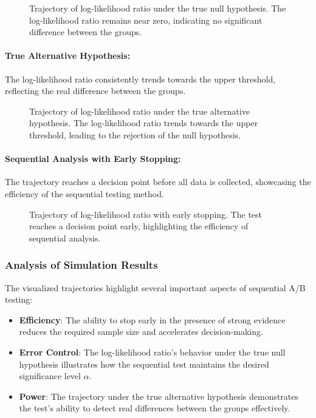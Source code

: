 \documentclass[magisterska, english]{pwr_wmat_praca_dyplomowa}
\theoremstyle{plain}
\numberwithin{theorem}{chapter}
\theoremstyle{definition}
\numberwithin{theorem}{chapter}
\begin{document}
\begin{figure}[H]
	\centering
	\caption{Trajectory of log-likelihood ratio under the true null hypothesis. The log-likelihood ratio remains near zero, indicating no significant difference between the groups.}
	\label{fig:null_hypothesis_trajectory}
\end{figure}

\paragraph{True Alternative Hypothesis:}
The log-likelihood ratio consistently trends towards the upper threshold, reflecting the real difference between the groups.

\begin{figure}[H]
	\centering
	\caption{Trajectory of log-likelihood ratio under the true alternative hypothesis. The log-likelihood ratio trends towards the upper threshold, leading to the rejection of the null hypothesis.}
	\label{fig:alternative_hypothesis_trajectory}
\end{figure}

\paragraph{Sequential Analysis with Early Stopping:}
The trajectory reaches a decision point before all data is collected, showcasing the efficiency of the sequential testing method.

\begin{figure}[H]
	\centering
	\caption{Trajectory of log-likelihood ratio with early stopping. The test reaches a decision point early, highlighting the efficiency of sequential analysis.}
	\label{fig:early_stopping_trajectory}
\end{figure}

\subsubsection{Analysis of Simulation Results}

The visualized trajectories highlight several important aspects of sequential A/B testing:
\begin{itemize}
	\item \textbf{Efficiency}: The ability to stop early in the presence of strong evidence reduces the required sample size and accelerates decision-making.
	\item \textbf{Error Control}: The log-likelihood ratio's behavior under the true null hypothesis illustrates how the sequential test maintains the desired significance level \(\alpha\).
	\item \textbf{Power}: The trajectory under the true alternative hypothesis demonstrates the test's ability to detect real differences between the groups effectively.
\end{itemize}
\end{document}
